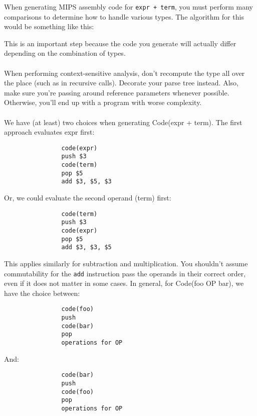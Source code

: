 \documentclass[]{article}
\theoremstyle{definition}
\newcommand{\lecture}[1]{\marginpar{{\footnotesize $\leftarrow$ \underline{#1}}}}
\begin{document}
				When generating MIPS assembly code for \verb|expr + term|, you must perform many comparisons to determine how to handle various types. The algorithm for this would be something like this: \\
				\begin{algorithm}[H]
				\end{algorithm}

				This is an important step because the code you generate will actually differ depending on the combination of types.
				\\ \\
				When performing context-sensitive analysis, don't recompute the type all over the place (such as in recursive calls). Decorate your parse tree instead. Also, make sure you're passing around reference parameters whenever possible. Otherwise, you'll end up with a program with worse complexity. \lecture{March 20, 2013}
				\\ \\
				We have (at least) two choices when generating Code(expr + term). The first approach evaluates expr first:
				\begin{verbatim}
				code(expr)
				push $3
				code(term)
				pop $5
				add $3, $5, $3
				\end{verbatim}

				Or, we could evaluate the second operand (term) first:
				\begin{verbatim}
				code(term)
				push $3
				code(expr)
				pop $5
				add $3, $3, $5
				\end{verbatim}

				This applies similarly for subtraction and multiplication. You shouldn't assume commutability for the \verb+add+ instruction \textendash{} pass the operands in their correct order, even if it does not matter in some cases. In general, for Code(foo OP bar), we have the choice between:
				\begin{verbatim}
				code(foo)
				push
				code(bar)
				pop
				operations for OP
				\end{verbatim}

				And:
				\begin{verbatim}
				code(bar)
				push
				code(foo)
				pop
				operations for OP
				\end{verbatim}
\end{document}

